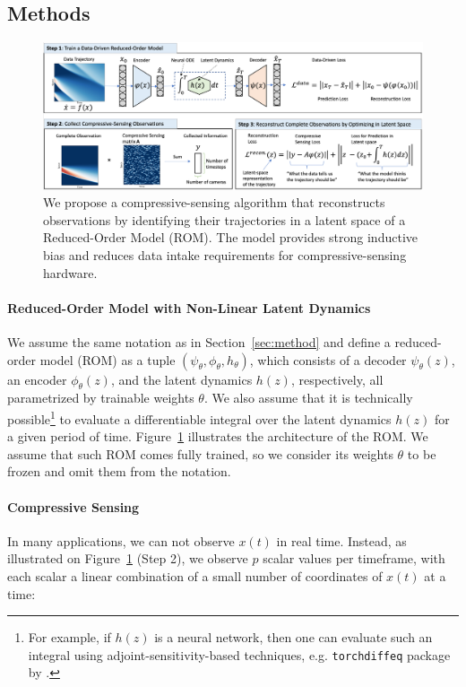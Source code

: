 \subsection{Methods}
\label{sec:cs_methods}
\begin{figure}
    \centering
    \includegraphics[width=\textwidth]{figures/cs_abstract.png}
    \caption{\label{fig:cs_abstract}We propose a compressive-sensing algorithm that reconstructs observations by identifying their trajectories in a latent space of a Reduced-Order Model (ROM). The model provides strong inductive bias and reduces data intake requirements for compressive-sensing hardware.}
\end{figure}

\paragraph{Reduced-Order Model with Non-Linear Latent Dynamics} We assume the same notation as in Section~\ref{sec:method} and define a reduced-order model (ROM) as a tuple $(\psi_\theta, \phi_\theta, h_\theta)$, which consists of a decoder $\psi_\theta(z)$, an encoder $\phi_\theta(z)$, and the latent dynamics $h(z)$, respectively, all parametrized by trainable weights $\theta$. We also assume that it is technically possible\footnote{For example, if $h(z)$ is a neural network, then one can evaluate such an integral using adjoint-sensitivity-based techniques, e.g. \texttt{torchdiffeq} package by \cite{chen2018neuralode}.} to evaluate a differentiable integral over the latent dynamics $h(z)$ for a given period of time. Figure~\ref{fig:cs_abstract} illustrates the architecture of the ROM. We assume that such ROM comes fully trained, so we consider its weights $\theta$ to be frozen and omit them from the notation. 

\paragraph{Compressive Sensing} In many applications, we can not observe $x(t)$ in real time. Instead, as illustrated on Figure~\ref{fig:cs_abstract} (Step 2), we observe $p$ scalar values per timeframe, with each scalar a linear combination of a small number of coordinates of $x(t)$ at a time:

